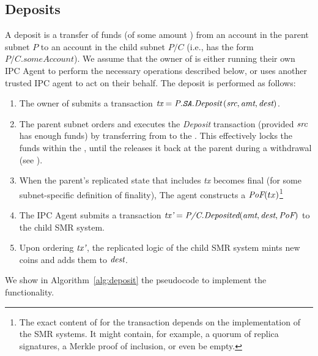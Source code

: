 \subsection{Deposits}
\label{sec:deposit}


A deposit is a transfer of funds (of some amount \fil) from an account \src in the parent subnet $P$ to an account \dest in the child subnet $P/C$ (i.e., \dest has the form $P/C.someAccount$).
We assume that the owner of \src is either running their own IPC Agent to perform the necessary operations described below, or uses another trusted IPC agent to act on their behalf.
The deposit is performed as follows:
\begin{enumerate}
    \item The owner of \src submits a transaction
    $\textit{tx}=\textit{P.\texttt{SA}.Deposit}\left(\textit{src}, \textit{amt}, \textit{dest} \right)$.
    \item The parent subnet orders and executes the \emph{Deposit} transaction (provided $\textit{src}$ has enough funds) by transferring \fil from \src to the \sa. This effectively locks the funds within the \sa \actor, until the \sa \actor releases it back at the parent during a withdrawal (see ). 
    \item When the parent's replicated state that includes \emph{tx} becomes final (for some subnet-specific definition of finality),
    The \ipc agent constructs a $\textit{PoF}(tx)$\footnote{The exact content of \prf for the transaction  depends on the implementation of the SMR systems. It might contain, for example, a quorum of replica signatures, a Merkle proof of inclusion, or even be empty.}
    \item The IPC Agent submits a transaction $\textit{tx'} = \textit{P/C.Deposited}(\textit{amt}, \textit{dest}, \textit{PoF})$ to the child SMR system.
    \item Upon ordering $\textit{tx'}$, the replicated logic of the child SMR system mints \fil new coins and adds them to $\textit{dest}$.
\end{enumerate}

We show in Algorithm~\ref{alg:deposit} the pseudocode to implement the functionality. 

